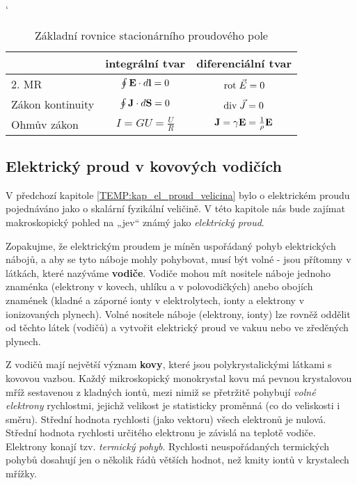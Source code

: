    \begin{table}[ht!]
      \centering
      \catcode`
      \begin{tabular}{l c|c|}
        \cline{2-3}
        \multicolumn{1}{l|}{} 
          & \textbf{integrální tvar} & \textbf{diferenciální tvar}             \\
        \hline
        \multicolumn{1}{|l|}{2. MR} 
          & $\oint\mathbf{E}\cdot d\mathbf{l} = 0$ & $\mathrm{rot}\;\vec{E} = 0$                     \\ 
        \cline{1-3}
        \hline
        \multicolumn{1}{|l|}{Zákon kontinuity} 
          & $\oint\mathbf{J}\cdot d\mathbf{S}=0$ & $\mathrm{div}\;\vec{J}=0$                       \\
        \cline{1-3}
        \multicolumn{1}{|l|}{Ohmův zákon} 
          & $I=GU=\frac{U}{R}$ & $\mathbf{J} =\gamma\mathbf{E} = \frac{1}{\rho}\mathbf{E}$ \\
        \cline{1-3}
      \end{tabular}
      \caption{Základní rovnice stacionárního proudového pole}
    \end{table}
    
    \subsection{Elektrický proud v kovových vodičích}\label{TEMP:kap_elproud_jev}
      V předchozí kapitole \ref{TEMP:kap_el_proud_velicina} bylo o elektrickém proudu pojednáváno
      jako o skalární fyzikální veličině. V této kapitole nás bude zajímat makroskopický pohled na
      „jev“ známý jako \emph{elektrický proud}.
      
      Zopakujme, že elektrickým proudem je míněn uspořádaný pohyb elektrických ná\-bo\-jů, a aby se
      tyto náboje mohly pohybovat, musí být volné - jsou přítomny v látkách, které nazýváme
      \textbf{vodiče}. Vodiče mohou mít nositele náboje jednoho znaménka (elektrony v kovech,
      uhlíku a v polovodičkých) anebo obojích znamének (kladné a záporné ionty v elektrolytech,
      ionty a elektrony v ionizovaných plynech). Volné nositele náboje (elektrony, ionty) lze
      rovněž oddělit od těchto látek (vodičů) a vytvořit elektrický proud ve vakuu nebo ve
      zředěných plynech.
      
      Z vodičů mají největší význam \textbf{kovy}, které jsou polykrystalickými látkami s kovovou
      vazbou. Každý mikroskopický monokrystal kovu má pevnou krystalovou mříž sestavenou z kladných
      iontů, mezi nimiž se přetržitě pohybují \emph{volné elektrony} rychlost\-mi, jejichž velikost
      je statisticky proměnná (co do veliskosti i směru). Střední hodnota rychlosti (jako vektoru)
      všech elektronů je nulová. Střední hodnota rychlosti určitého elektronu je závislá na teplotě
      vodiče. Elektrony konají tzv. \emph{termický pohyb}. Rychlosti neuspořádaných termických
      pohybů dosahují jen o několik řádů větších hodnot, než kmity iontů v krystalech mřížky.


